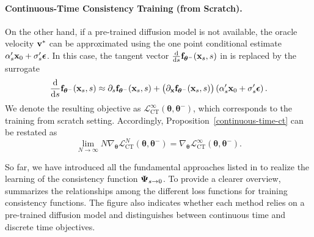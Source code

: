 \paragraph{Continuous-Time Consistency Training (from Scratch).} On the other hand, if a pre-trained diffusion model is not available, the oracle
velocity ${\mathbf{v}}^*$ can be approximated using the one point conditional estimate
$\alpha_s'{\mathbf{x}}_0 + \sigma_s'{\bm{\epsilon}}$. In this case, the tangent vector
$\tfrac{\mathop{}\!\mathrm{d}}{\mathop{}\!\mathrm{d} s}{\mathbf{f}}_{{\bm{\theta}}^-}({\mathbf{x}}_s,s)$ in
 is replaced by the surrogate
\begin{align}\label{eq:ct-continuous-time}
    \frac{\mathop{}\!\mathrm{d}}{\mathop{}\!\mathrm{d} s}{\mathbf{f}}_{{\bm{\theta}}^-}({\mathbf{x}}_s,s) 
     \approx 
    \partial_s {\mathbf{f}}_{{\bm{\theta}}^-}({\mathbf{x}}_s,s)
    + \big(\partial_{{\mathbf{x}}}{\mathbf{f}}_{{\bm{\theta}}^-}({\mathbf{x}}_s,s)\big) 
      \left(\alpha_s'{\mathbf{x}}_0 + \sigma_s'{\bm{\epsilon}}\right).
\end{align}
We denote the resulting objective as
$\mathcal{L}^\infty_{\mathrm{CT}}(\bm{\theta},\bm{\theta}^-)$, which corresponds
to the training from scratch setting. Accordingly,
Proposition~\ref{continuous-time-ct} can be restated as
\[
\lim_{N\to\infty} 
N  \nabla_{\bm{\theta}} 
\mathcal{L}_{\mathrm{CT}}^{N}(\bm{\theta},\bm{\theta}^-)
 =
\nabla_{\bm{\theta}} 
\mathcal{L}_{\mathrm{CT}}^{\infty}(\bm{\theta},\bm{\theta}^-).
\]



So far, we have introduced all the fundamental approaches listed in 
 to realize the learning of the consistency 
function ${\bm{\Psi}}_{s\to 0}$. 
To provide a clearer overview,  summarizes the 
relationships among the different loss functions for training consistency 
functions. 
The figure also indicates whether each method relies on a pre-trained diffusion 
model and distinguishes between continuous time and discrete time objectives.




